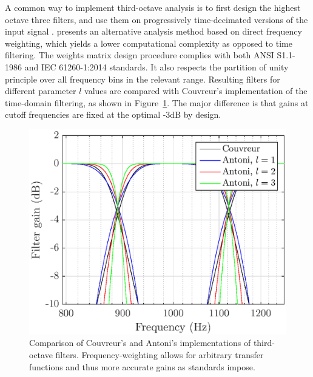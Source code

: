 \documentclass[final,3p,times,twocolumn]{elsarticle}
\begin{document}
A common way to implement third-octave analysis is to first design the highest octave three filters, and use them on progressively time-decimated versions of the input signal \cite{davis1986}. \cite{antoni2010} presents an alternative analysis method based on direct frequency weighting, which yields a lower computational complexity as opposed to time filtering. The weights matrix design procedure complies with both ANSI S1.1-1986 \cite{citeulike:9580295} and IEC 61260-1:2014 \cite{iec-norm} standards. It also respects the partition of unity principle over all frequency bins in the relevant range. Resulting filters for different parameter $l$ values are compared with Couvreur's implementation \cite{couvreur} of the time-domain filtering, as shown in Figure~\ref{fig:freq_filt}. The major difference is that gains at cutoff frequencies are fixed at the optimal -3dB by design.\\

\begin{figure}[htbp]
	\centering
		\includegraphics[width=\columnwidth]{figures/tob_imp.eps}
	\caption{Comparison of Couvreur's and Antoni's implementations of third-octave filters. Frequency-weighting allows for arbitrary transfer functions and thus more accurate gains as standards impose.}
	\label{fig:freq_filt}
\end{figure}
\end{document}
